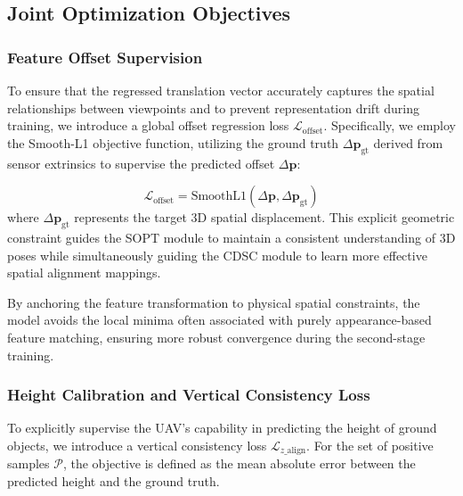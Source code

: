 \documentclass[conference]{IEEEtran}
\begin{document}
\subsection{Joint Optimization Objectives}

\subsubsection{Feature Offset Supervision}

To ensure that the regressed translation vector accurately captures the spatial relationships between viewpoints and to prevent representation drift during training, we introduce a global offset regression loss $\mathcal{L}_{\text{offset}}$. Specifically, we employ the Smooth-L1 objective function, utilizing the ground truth $\Delta \mathbf{p}_{\text{gt}}$ derived from sensor extrinsics to supervise the predicted offset $\Delta \mathbf{p}$:

\begin{equation}
\mathcal{L}_{\text{offset}} = \text{SmoothL1}(\Delta \mathbf{p}, \Delta \mathbf{p}_{\text{gt}})
\end{equation}
where $\Delta \mathbf{p}_{\text{gt}}$ represents the target 3D spatial displacement. This explicit geometric constraint guides the SOPT module to maintain a consistent understanding of 3D poses while simultaneously guiding the CDSC module to learn more effective spatial alignment mappings. 

By anchoring the feature transformation to physical spatial constraints, the model avoids the local minima often associated with purely appearance-based feature matching, ensuring more robust convergence during the second-stage training.

\subsubsection{Height Calibration and Vertical Consistency Loss}

To explicitly supervise the UAV's capability in predicting the height of ground objects, we introduce a vertical consistency loss $\mathcal{L}_{z\_\text{align}}$. For the set of positive samples $\mathcal{P}$, the objective is defined as the mean absolute error between the predicted height and the ground truth.
\end{document}
